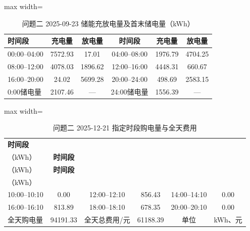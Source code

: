 \documentclass[UTF8,a4paper,zihao=-4,fontset=windows]{ctexart}
\begin{document}
\begin{table}[H]\centering
\fontsize{9.5}{12}\selectfont\setlength{\tabcolsep}{4pt}\renewcommand{\arraystretch}{1.12}
\begin{adjustbox}{max width=\linewidth}\begin{tabular}{lccccc}\toprule
\textbf{时间段} & \textbf{充电量} & \textbf{放电量} & \textbf{时间段} & \textbf{充电量} & \textbf{放电量}\\\midrule
00:00–04:00 & 7572.93 & 17.01 & 04:00–08:00 & 1976.79 & 4704.25\\
08:00–12:00 & 4078.03 & 1896.62 & 12:00–16:00 & 4448.31 & 660.67\\
16:00–20:00 & 24.02 & 5699.28 & 20:00–24:00 & 498.69 & 2583.15\\
0:00储电量 & 2107.46 & — & 24:00储电量 & 1556.39 & —\\
\bottomrule\end{tabular}\end{adjustbox}
\caption{问题二 2025-09-23 储能充放电量及首末储电量（kWh）}
\end{table}
\begin{table}[H]\centering
\fontsize{9.5}{12}\selectfont\setlength{\tabcolsep}{4pt}\renewcommand{\arraystretch}{1.12}
\begin{adjustbox}{max width=\linewidth}\begin{tabular}{lccccc}\toprule
\textbf{时间段} & \shortstack{\textbf{购电量}\\{\normalfont （kWh）}} & \textbf{时间段} & \shortstack{\textbf{购电量}\\{\normalfont （kWh）}} & \textbf{时间段} & \shortstack{\textbf{购电量}\\{\normalfont （kWh）}}\\\midrule
10:00–10:10 & 0.00 & 12:00–12:10 & 856.43 & 14:00–14:10 & 0.00\\
16:00–16:10 & 813.89 & 18:00–18:10 & 678.35 & 20:00–20:10 & 0.00\\
全天购电量 & 94191.33 & 全天总费用/元 & 61188.39 & 单位 & kWh、元\\
\bottomrule\end{tabular}\end{adjustbox}
\caption{问题二 2025-12-21 指定时段购电量与全天费用}
\end{table}
\end{document}
